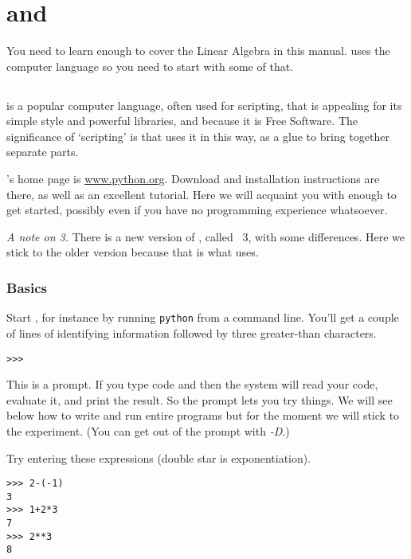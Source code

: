 \chapter{\python{} and \sage{}}

You need to learn enough \sage{} to cover the Linear Algebra
in this manual.
\sage{} uses the computer language \python{} so you need to start with 
some of that.




\section{\python}
\python{} is a popular computer language, often used for scripting,
that is appealing for its simple style and powerful libraries,
and because it is Free Software.
The significance of `scripting' is that \sage{} uses it in this way,
as a glue to bring together separate parts.

\python's home page is \href{http://www.python.org}{\url{www.python.org}}.
Download and installation instructions are there, as well as 
an excellent tutorial.
Here we will acquaint you with enough \python{} to get started, possibly
even if you have no programming experience whatsoever.

\smallskip
\textit{A note on \python{} 3.}
There is a new version of \python{}, called \python~3, with some differences.
Here we stick to the older version 
because that is what \sage{} uses.


\subsection{Basics}
Start \python, for instance by running 
\lstinline[style=inline]!python!
from a command line.
You'll get a couple of lines of 
identifying information followed by three greater-than
characters.
\begin{lstlisting}[style=python]
>>>   
\end{lstlisting}
This is a prompt.
If you type \python{} code and  then the system
will read your code, evaluate it, and print the result.
So the prompt lets you try things.
We will see below how to write and run entire \python{} programs
but for the moment we will stick to the experiment. 
(You can get out of the prompt with \textit{-D}.)

Try entering these expressions (double star is exponentiation).
\begin{lstlisting}[style=python]
>>> 2-(-1)
3
>>> 1+2*3
7
>>> 2**3
8  
\end{lstlisting}


